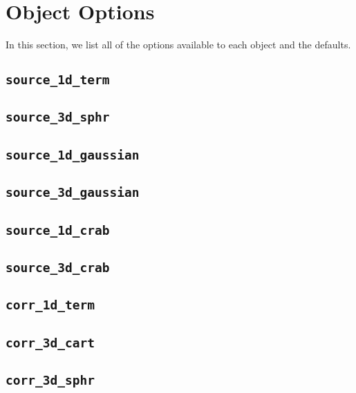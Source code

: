 \section{Object Options}
In this section, we list all of the options available to each object and the
defaults.

\subsection{{\tt source\_1d\_term}}


\subsection{{\tt source\_3d\_sphr}}


\subsection{{\tt source\_1d\_gaussian}}


\subsection{{\tt source\_3d\_gaussian}}


\subsection{{\tt source\_1d\_crab}}


\subsection{{\tt source\_3d\_crab}}


\subsection{{\tt corr\_1d\_term}}


\subsection{{\tt corr\_3d\_cart}}


\subsection{{\tt corr\_3d\_sphr}}


